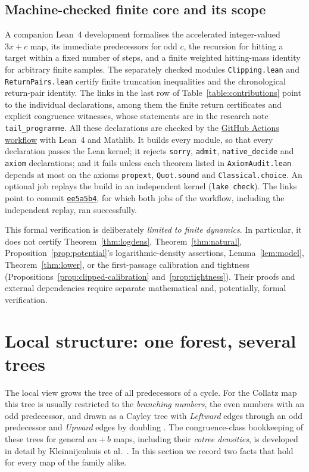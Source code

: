 \documentclass[12pt]{amsart}
\theoremstyle{definition}
\theoremstyle{remark}
\begin{document}
\subsection*{Machine-checked finite core and its scope}
A companion Lean~4 development formalises the accelerated integer-valued
$3x+c$ map, its immediate predecessors for odd $c$, the recursion for
hitting a target within a fixed number of steps, and a finite weighted
hitting-mass identity for arbitrary finite samples. The separately checked
modules \texttt{Clipping.lean} and \texttt{ReturnPairs.lean} certify
finite truncation inequalities and the chronological return-pair identity. The links in the last row of Table~\ref{table:contributions} point to the
individual declarations, among them the finite return certificates and explicit
congruence witnesses, whose statements are in the research note \texttt{tail\_programme}. All these declarations are checked by the
\href{https://github.com/Sultanow/collatz/actions/workflows/collatz-lean.yml}{GitHub Actions workflow}
with Lean~4 and Mathlib. It builds every module, so that every declaration
passes the Lean kernel; it rejects \texttt{sorry}, \texttt{admit},
\texttt{native\_decide} and \texttt{axiom} declarations; and it fails unless
each theorem listed in \texttt{AxiomAudit.lean} depends at most on the axioms
\texttt{propext}, \texttt{Quot.sound} and \texttt{Classical.choice}. An
optional job replays the build in an independent kernel (\texttt{lake check}).
The links point to commit \href{https://github.com/Sultanow/collatz/commit/ee5a5b4}{\texttt{ee5a5b4}}, for which both jobs of the workflow, including the independent replay, ran successfully.

This formal verification is deliberately \emph{limited to finite dynamics}.
In particular, it does not certify Theorem~\ref{thm:logdens},
Theorem~\ref{thm:natural},
Proposition~\ref{prop:potential}'s logarithmic-density assertions,
Lemma~\ref{lem:model}, Theorem~\ref{thm:lower}, or the first-passage calibration and
tightness (Propositions~\ref{prop:clipped-calibration} and~\ref{prop:tightness}). Their proofs and external dependencies require separate
mathematical and, potentially, formal verification.

\FloatBarrier

\section{Local structure: one forest, several trees}
\label{sec:local}
The local view grows the tree of all predecessors of a cycle. For the Collatz map this tree is usually restricted to the \emph{branching numbers}, the even numbers with an odd predecessor, and drawn as a Cayley tree with \emph{Leftward} edges through an odd predecessor and \emph{Upward} edges by doubling \cite{Sultanow_graph_2020}. The congruence-class bookkeeping of these trees for general $an+b$ maps, including their \emph{cotree densities}, is developed in detail by Kleinnijenhuis et al.\ \cite{Kleinnijenhuis_2026}. In this section we record two facts that hold for every map of the family alike.
\end{document}
